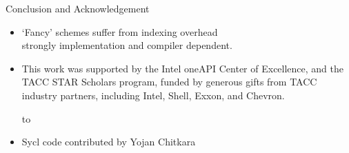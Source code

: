 \documentclass[10pt,t]{beamer}
\begin{document}
\begin{comment}
  \begin{frame}[containsverbatim]{Can we use execution policies?}
    \begin{itemize}
    \item Last time I tried there was a compiler issue
    \item That 5-point stencil is hard to express in range views!
    \end{itemize}
  \end{frame}
\end{comment}

\begin{frame}[containsverbatim]{Conclusion and Acknowledgement}
  \begin{itemize}
  \item `Fancy' schemes suffer from indexing overhead\\
    strongly implementation and compiler dependent.
  \item This work was supported by
    the Intel oneAPI Center of Excellence, and the 
    TACC STAR Scholars program,
    funded by generous gifts from TACC industry partners, including Intel, Shell, Exxon,
    and Chevron.\par
  \hbox to 
  \item Sycl code contributed by Yojan Chitkara
  \end{itemize}
\end{frame}
\end{document}
